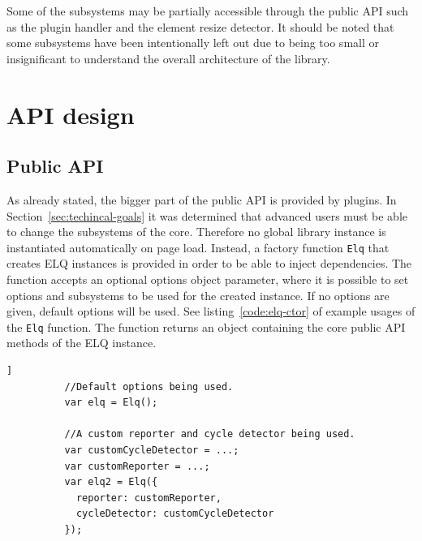\documentclass[a4paper,11pt]{kth-mag}
\newcommand{\code}[1]{\texttt{#1}}
\begin{document}
      Some of the subsystems may be partially accessible through the public \gls{API} such as the plugin handler and the \gls{element} resize detector.
      It should be noted that some subsystems have been intentionally left out due to being too small or insignificant to understand the overall architecture of the library.

   
    \section{API design}\label{sec:elq-api}
      \subsection{Public API}\label{sec:public-api}
        As already stated, the bigger part of the public \gls{API} is provided by plugins.
        In Section~\ref{sec:techincal-goals} it was determined that advanced users must be able to change the subsystems of the core.
        Therefore no global library instance is instantiated automatically on page load.
        Instead, a factory function \code{Elq} that creates \gls{ELQ} instances is provided in order to be able to inject dependencies.
        The function accepts an optional options object parameter, where it is possible to set options and subsystems to be used for the created instance.
        If no options are given, default options will be used.
        See listing~\ref{code:elq-ctor} of example usages of the \code{Elq} function.
        The function returns an object containing the core public \gls{API} methods of the \gls{ELQ} instance.
        \begin{lstlisting}[gobble=10,caption={Example usages of the \code{Elq} factory function that creates \gls{ELQ} instances.},captionpos=b,label={code:elq-ctor}]]
          //Default options being used.
          var elq = Elq();

          //A custom reporter and cycle detector being used.
          var customCycleDetector = ...;
          var customReporter = ...;
          var elq2 = Elq({
            reporter: customReporter,
            cycleDetector: customCycleDetector
          });
        \end{lstlisting}
\end{document}
